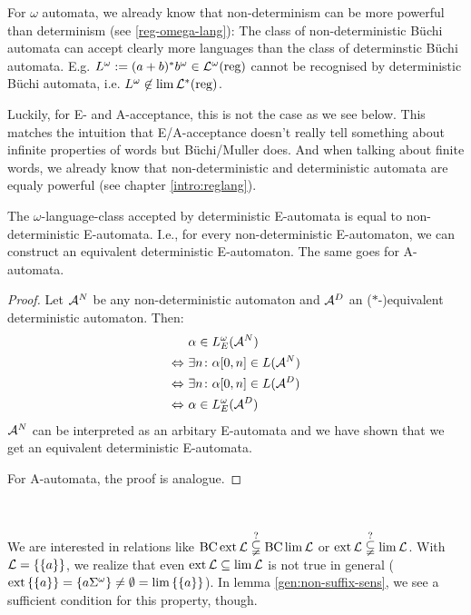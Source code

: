 For $\omega$ automata, we already know that non-determinism can be more powerful than determinism (see \ref{reg-omega-lang}): The class of non-deterministic Büchi automata can accept clearly more languages than the class of determinstic Büchi automata. E.g. $L^\omega := (a+b)^* b^\omega \in \mathcal{L}^\omega(\text{reg})$ cannot be recognised by deterministic Büchi automata, i.e. $L^\omega \not\in \lim \mathcal{L}^*(\text{reg})$.

Luckily, for E- and A-acceptance, this is not the case as we see below. This matches the intuition that E/A-acceptance doesn't really tell something about infinite properties of words but Büchi/Muller does. And when talking about finite words, we already know that non-deterministic and deterministic automata are equaly powerful (see chapter \ref{intro:reglang}).

\begin{lemma}
\label{gen:e-determinism}
The $\omega$-language-class accepted by deterministic E-automata is equal to non-deterministic E-automata. I.e., for every non-deterministic E-automaton, we can construct an equivalent deterministic E-automaton. The same goes for A-automata.
\begin{proof} Let $\mathcal{A}^N$ be any non-deterministic automaton and $\mathcal{A}^D$ an ($*$-)equivalent deterministic automaton. Then:
\begin{align*}
& \alpha \in L^{\omega}_E(\mathcal{A}^N) \\
\Leftrightarrow \ & \exists n \colon \alpha[0,n] \in L(\mathcal{A}^N) \\
\Leftrightarrow \ & \exists n \colon \alpha[0,n] \in L(\mathcal{A}^D) \\
\Leftrightarrow \ & \alpha \in L^{\omega}_E(\mathcal{A}^D)
\end{align*}
$\mathcal{A}^N$ can be interpreted as an arbitary E-automata and we have shown that we get an equivalent deterministic E-automata.

For A-automata, the proof is analogue.
\end{proof}
\end{lemma}

\

We are interested in relations like $\operatorname{BC} \operatorname{ext} \mathcal{L} \overset{?}{\subsetneqq} \operatorname{BC} \lim \mathcal{L}$ or $\operatorname{ext} \mathcal{L} \overset{?}{\subsetneqq} \lim \mathcal{L}$. With $\Lang = \Set{\Set{a}}$, we realize that even $\operatorname{ext} \mathcal{L} \subseteq \lim \mathcal{L}$ is not true in general ($\ext \Set{\Set{a}} = \Set{a \Sigma^\omega} \neq \emptyset = \lim \Set{\Set{a}}$). In lemma \ref{gen:non-suffix-sens}, we see a sufficient condition for this property, though.


